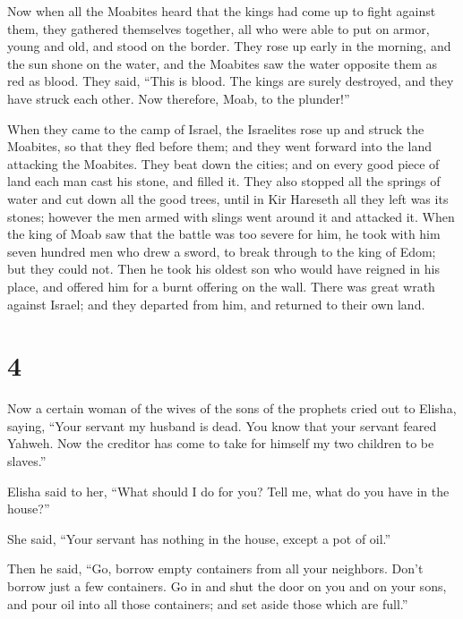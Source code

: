  Now when all the Moabites heard that the kings had come up
to fight against them, they gathered themselves together, all who were
able to put on armor, young and old, and stood on the border.
 They rose up early in the morning, and the sun shone on
the water, and the Moabites saw the water opposite them as red as blood.
 They said, ``This is blood. The kings are surely
destroyed, and they have struck each other. Now therefore, Moab, to the
plunder!''

 When they came to the camp of Israel, the Israelites rose
up and struck the Moabites, so that they fled before them; and they went
forward into the land attacking the Moabites.  They beat
down the cities; and on every good piece of land each man cast his
stone, and filled it. They also stopped all the springs of water and cut
down all the good trees, until in Kir Hareseth all they left was its
stones; however the men armed with slings went around it and attacked
it.  When the king of Moab saw that the battle was too
severe for him, he took with him seven hundred men who drew a sword, to
break through to the king of Edom; but they could not. 
Then he took his oldest son who would have reigned in his place, and
offered him for a burnt offering on the wall. There was great wrath
against Israel; and they departed from him, and returned to their own
land.

\hypertarget{section-3}{%
\section{4}\label{section-3}}

 Now a certain woman of the wives of the sons of the
prophets cried out to Elisha, saying, ``Your servant my husband is dead.
You know that your servant feared Yahweh. Now the creditor has come to
take for himself my two children to be slaves.''

 Elisha said to her, ``What should I do for you? Tell me,
what do you have in the house?''

She said, ``Your servant has nothing in the house, except a pot of
oil.''

 Then he said, ``Go, borrow empty containers from all your
neighbors. Don't borrow just a few containers.  Go in and
shut the door on you and on your sons, and pour oil into all those
containers; and set aside those which are full.''

